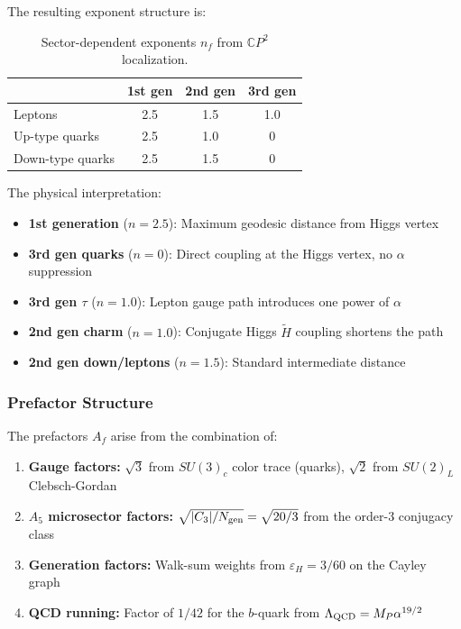 The resulting exponent structure is:
\begin{table}[h]
\caption{Sector-dependent exponents $n_f$ from $\mathbb{C}P^2$ localization.}
\label{tab:exponents}
\begin{ruledtabular}
\begin{tabular}{lccc}
 & 1st gen & 2nd gen & 3rd gen \\
\hline
Leptons & 2.5 & 1.5 & 1.0 \\
Up-type quarks & 2.5 & 1.0 & 0 \\
Down-type quarks & 2.5 & 1.5 & 0 \\
\end{tabular}
\end{ruledtabular}
\end{table}

The physical interpretation:
\begin{itemize}
\item \textbf{1st generation} ($n = 2.5$): Maximum geodesic distance from Higgs vertex
\item \textbf{3rd gen quarks} ($n = 0$): Direct coupling at the Higgs vertex, no $\alpha$ suppression
\item \textbf{3rd gen $\tau$} ($n = 1.0$): Lepton gauge path introduces one power of $\alpha$
\item \textbf{2nd gen charm} ($n = 1.0$): Conjugate Higgs $\tilde{H}$ coupling shortens the path
\item \textbf{2nd gen down/leptons} ($n = 1.5$): Standard intermediate distance
\end{itemize}

\subsubsection{Prefactor Structure}

The prefactors $A_f$ arise from the combination of:
\begin{enumerate}
\item \textbf{Gauge factors:} $\sqrt{3}$ from $SU(3)_c$ color trace (quarks), $\sqrt{2}$ from $SU(2)_L$ Clebsch-Gordan
\item \textbf{$A_5$ microsector factors:} $\sqrt{|C_3|/N_{\rm gen}} = \sqrt{20/3}$ from the order-3 conjugacy class
\item \textbf{Generation factors:} Walk-sum weights from $\varepsilon_H = 3/60$ on the Cayley graph
\item \textbf{QCD running:} Factor of $1/42$ for the $b$-quark from $\Lambda_{\rm QCD} = M_P \alpha^{19/2}$
\end{enumerate}


